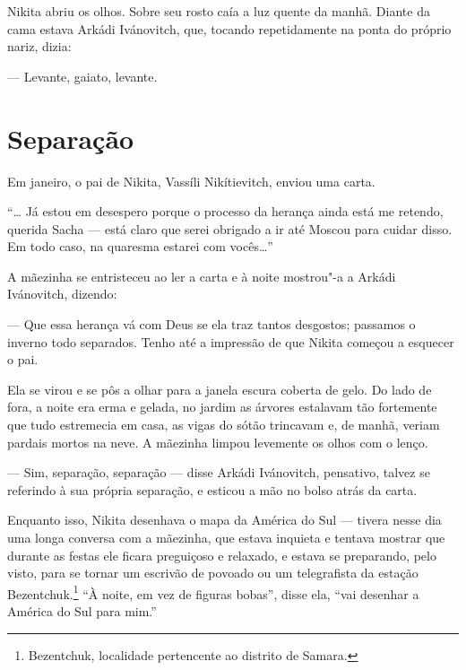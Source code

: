 Nikita abriu os olhos. Sobre seu rosto caía a luz quente da manhã.
Diante da cama estava Arkádi Ivánovitch, que, tocando repetidamente na
ponta do próprio nariz, dizia:

--- Levante, gaiato, levante.

\chapter{Separação}

Em janeiro, o pai de Nikita, Vassíli Nikítievitch, enviou uma carta.

``\ldots{} Já estou em desespero porque o processo da herança ainda está me
retendo, querida Sacha --- está claro que serei obrigado a ir até Moscou
para cuidar disso. Em todo caso, na quaresma estarei com vocês\ldots{}''

A mãezinha se entristeceu ao ler a carta e à noite mostrou"-a a Arkádi
Ivánovitch, dizendo:

--- Que essa herança vá com Deus se ela traz tantos desgostos; passamos
o inverno todo separados. Tenho até a impressão de que Nikita começou a
esquecer o pai.

Ela se virou e se pôs a olhar para a janela escura coberta de gelo. Do
lado de fora, a noite era erma e gelada, no jardim as árvores estalavam
tão fortemente que tudo estremecia em casa, as vigas do sótão trincavam
e, de manhã, veriam pardais mortos na neve. A mãezinha limpou levemente
os olhos com o lenço.

--- Sim, separação, separação --- disse Arkádi Ivánovitch, pensativo,
talvez se referindo à sua própria separação, e esticou a mão no bolso
atrás da carta.

Enquanto isso, Nikita desenhava o mapa da América do Sul --- tivera
nesse dia uma longa conversa com a mãezinha, que estava inquieta e
tentava mostrar que durante as festas ele ficara preguiçoso e
relaxado, e estava se preparando, pelo visto, para se tornar um escrivão
de povoado ou um telegrafista da estação Bezentchuk.\footnote{Bezentchuk,
  localidade pertencente ao distrito de Samara.} ``À noite, em vez de
figuras bobas'', disse ela, ``vai desenhar a América do Sul para mim.''

